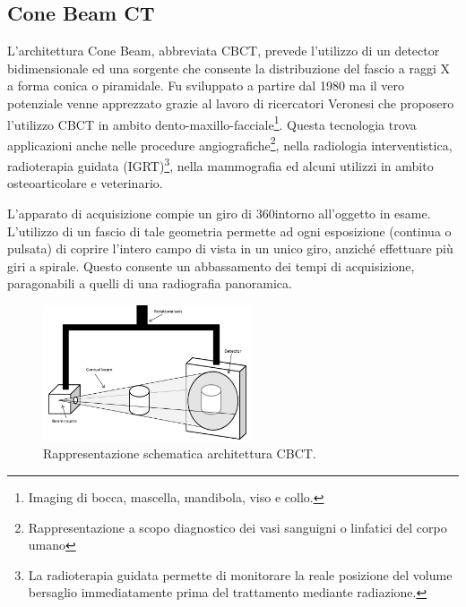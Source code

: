 \documentclass[a4paper,12pt, doubleside]{report}
\begin{document}
            \subsection{Cone Beam CT}
                \par
                    L'architettura Cone Beam, abbreviata CBCT, prevede l'utilizzo di un detector bidimensionale ed una sorgente che consente la distribuzione del fascio a raggi X a forma conica o piramidale. Fu sviluppato a partire dal 1980 ma il vero potenziale venne apprezzato grazie al lavoro di ricercatori Veronesi che proposero l'utilizzo CBCT in ambito dento-maxillo-facciale\footnote{Imaging di bocca, mascella, mandibola, viso e collo.}. Questa tecnologia trova applicazioni anche nelle procedure angiografiche\footnote{Rappresentazione a scopo diagnostico dei vasi sanguigni o linfatici del corpo umano}, nella radiologia interventistica, radioterapia guidata (IGRT)\footnote{La radioterapia guidata permette di monitorare la reale posizione del volume bersaglio immediatamente prima del trattamento mediante radiazione.}, nella mammografia ed alcuni utilizzi in ambito osteoarticolare e veterinario.
                
                \bigskip
                \par
                    L'apparato di acquisizione compie un giro di 360\degree intorno all'oggetto in esame. L'utilizzo di un fascio di tale geometria permette ad ogni esposizione (continua o pulsata) di coprire l'intero campo di vista in un unico giro, anziché effettuare più giri a spirale. Questo consente un abbassamento dei tempi di acquisizione, paragonabili a quelli di una radiografia panoramica.
                                   
                    \begin{figure}[h]
                        \centering
                        \includegraphics[width=0.55\textwidth]{cone_beam}
                        \caption{Rappresentazione schematica architettura CBCT.}
                        \label{fig:cbct}
                    \end{figure}
                    
\end{document}
